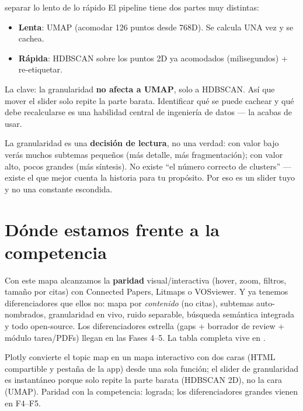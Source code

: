 \documentclass[11pt,a4paper]{article}
\begin{document}
\begin{concepto}{separar lo lento de lo rápido}
El pipeline tiene dos partes muy distintas:
\begin{itemize}
  \item \textbf{Lenta}: UMAP (acomodar 126 puntos desde 768D). Se calcula UNA vez y se cachea.
  \item \textbf{Rápida}: HDBSCAN sobre los puntos 2D ya acomodados (milisegundos) + re-etiquetar.
\end{itemize}
La clave: la granularidad \textbf{no afecta a UMAP}, solo a HDBSCAN. Así que mover el slider
solo repite la parte barata. Identificar qué se puede cachear y qué debe recalcularse es una
habilidad central de ingeniería de datos --- la acabas de usar.
\end{concepto}

\begin{ojo}
La granularidad es una \textbf{decisión de lectura}, no una verdad: con valor bajo verás
muchos subtemas pequeños (más detalle, más fragmentación); con valor alto, pocos grandes
(más síntesis). No existe ``el número correcto de clusters'' — existe el que mejor cuenta la
historia para tu propósito. Por eso es un slider tuyo y no una constante escondida.
\end{ojo}

\section{Dónde estamos frente a la competencia}

Con este mapa alcanzamos la \textbf{paridad} visual/interactiva (hover, zoom, filtros, tamaño
por citas) con Connected Papers, Litmaps o VOSviewer. Y ya tenemos diferenciadores que ellos
no: mapa por \emph{contenido} (no citas), subtemas auto-nombrados, granularidad en vivo,
ruido separable, búsqueda semántica integrada y todo open-source. Los diferenciadores
estrella (gaps + borrador de review + módulo tarea/PDFs) llegan en las Fases 4--5. La tabla
completa vive en .

\begin{resumen}
Plotly convierte el topic map en un mapa interactivo con dos caras (HTML compartible y
pestaña de la app) desde una sola función; el slider de granularidad es instantáneo porque
solo repite la parte barata (HDBSCAN 2D), no la cara (UMAP). Paridad con la competencia:
lograda; los diferenciadores grandes vienen en F4--F5.
\end{resumen}
\end{document}
